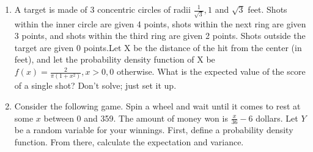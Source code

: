 
\begin{enumerate}
\item A target is made of 3 concentric circles of radii 
$\frac{1}{\sqrt{3}}, 1$ and $\sqrt{3}$ feet. Shots within the 
inner circle are given 4 points, shots within the next ring are 
given 3 points, and shots within the third ring are given 2 points. 
Shots outside the target are given 0 points.Let X be the distance 
of the hit from the center (in feet), and let the probability 
density function of X be
$f(x) =\frac{2}{\pi(1+x^2)},  x > 0, 0 $ otherwise.
What is the expected value of the score of a single shot? 
Don’t solve; just set it up. 


\vspace{8cm}

\item Consider the following game. Spin a wheel and wait until 
it comes to rest at some $x$ between 0 and 359. The amount of 
money won is $\frac{x}{36}-6$ dollars. Let $Y$ be a random 
variable for your winnings. First, define a probability density 
function. From there, calculate the expectation and variance. 








\end{enumerate}